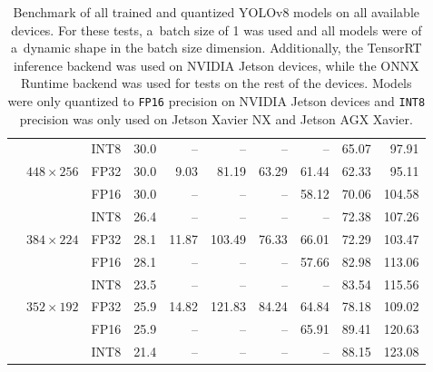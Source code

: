\begin{appendices}
\begin{table}[h]
\begin{threeparttable}
\begin{tabular}{|c|c|c|c|rrrrrr|}
                                                                    &                                   & INT8 & 30.0 &    -- &     -- &    -- &    -- & 65.07 &  97.91 \\
            \cline{2-10}
                                                                    & \multirow{3}{*}{$448 \times 256$} & FP32 & 30.0 &  9.03 &  81.19 & 63.29 & 61.44 & 62.33 &  95.11 \\
                                                                    &                                   & FP16 & 30.0 &    -- &     -- &    -- & 58.12 & 70.06 & 104.58 \\
                                                                    &                                   & INT8 & 26.4 &    -- &     -- &    -- &    -- & 72.38 & 107.26 \\
            \cline{2-10}
                                                                    & \multirow{3}{*}{$384 \times 224$} & FP32 & 28.1 & 11.87 & 103.49 & 76.33 & 66.01 & 72.29 & 103.47 \\
                                                                    &                                   & FP16 & 28.1 &    -- &     -- &    -- & 57.66 & 82.98 & 113.06 \\
                                                                    &                                   & INT8 & 23.5 &    -- &     -- &    -- &    -- & 83.54 & 115.56 \\
            \cline{2-10}
                                                                    & \multirow{3}{*}{$352 \times 192$} & FP32 & 25.9 & 14.82 & 121.83 & 84.24 & 64.84 & 78.18 & 109.02 \\
                                                                    &                                   & FP16 & 25.9 &    -- &     -- &    -- & 65.91 & 89.41 & 120.63 \\
                                                                    &                                   & INT8 & 21.4 &    -- &     -- &    -- &    -- & 88.15 & 123.08 \\
            \hline
        \end{tabular}
        \caption{Benchmark of all trained and quantized YOLOv8 models on all
        available devices. For these tests, a~batch size of 1 was used and all
        models were of a~dynamic shape in the batch size dimension. Additionally,
        the TensorRT inference backend was used on NVIDIA Jetson devices, while the
        ONNX Runtime backend was used for tests on the rest of the devices. Models
        were only quantized to \texttt{FP16} precision on NVIDIA Jetson devices and
        \texttt{INT8} precision was only used on Jetson Xavier NX and Jetson AGX
        Xavier.}
        \label{mAPvsFPS1}
    \end{threeparttable}
    \normalsize
\end{table}


\end{appendices}
